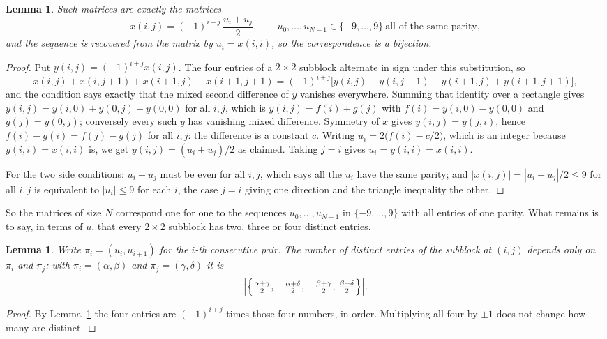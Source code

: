 \documentclass[11pt,a4paper]{article}
\theoremstyle{plain}
\newtheorem{lemma}[theorem]{Lemma}
\theoremstyle{definition}
\begin{document}
\begin{lemma}\label{lem:solve}
Such matrices are exactly the matrices
\[
x(i,j)=(-1)^{i+j}\,\frac{u_i+u_j}{2},
\qquad u_0,\dots,u_{N-1}\in\{-9,\dots,9\}\ \text{all of the same parity},
\]
and the sequence is recovered from the matrix by $u_i=x(i,i)$, so the correspondence is a
bijection.
\end{lemma}

\begin{proof}
Put $y(i,j)=(-1)^{i+j}x(i,j)$. The four entries of a $2\times2$ subblock alternate in sign
under this substitution, so
\[
x(i,j)+x(i,j{+}1)+x(i{+}1,j)+x(i{+}1,j{+}1)
=(-1)^{i+j}\bigl[y(i,j)-y(i,j{+}1)-y(i{+}1,j)+y(i{+}1,j{+}1)\bigr],
\]
and the condition says exactly that the mixed second difference of $y$ vanishes everywhere.
Summing that identity over a rectangle gives
$y(i,j)=y(i,0)+y(0,j)-y(0,0)$ for all $i,j$, which is $y(i,j)=f(i)+g(j)$ with
$f(i)=y(i,0)-y(0,0)$ and $g(j)=y(0,j)$; conversely every such $y$ has vanishing mixed
difference. Symmetry of $x$ gives $y(i,j)=y(j,i)$, hence $f(i)-g(i)=f(j)-g(j)$ for all $i,j$:
the difference is a constant $c$. Writing $u_i=2\bigl(f(i)-c/2\bigr)$, which is an integer
because $y(i,i)=x(i,i)$ is, we get $y(i,j)=(u_i+u_j)/2$ as claimed. Taking $j=i$ gives
$u_i=y(i,i)=x(i,i)$.

For the two side conditions: $u_i+u_j$ must be even for all $i,j$, which says all the $u_i$ have
the same parity; and $|x(i,j)|=|u_i+u_j|/2\le9$ for all $i,j$ is equivalent to $|u_i|\le9$
for each $i$, the case $j=i$ giving one direction and the triangle inequality the other.
\end{proof}

So the matrices of size $N$ correspond one for one to the sequences $u_0,\dots,u_{N-1}$ in
$\{-9,\dots,9\}$ with all entries of one parity. What remains is to say, in terms of $u$,
that every $2\times2$ subblock has two, three or four distinct entries.

\begin{lemma}\label{lem:block}
Write $\pi_i=(u_i,u_{i+1})$ for the $i$-th consecutive pair. The number of distinct entries of
the subblock at $(i,j)$ depends only on $\pi_i$ and $\pi_j$: with $\pi_i=(\alpha,\beta)$ and
$\pi_j=(\gamma,\delta)$ it is
\[
\Bigl|\Bigl\{\tfrac{\alpha+\gamma}{2},\,-\tfrac{\alpha+\delta}{2},\,
-\tfrac{\beta+\gamma}{2},\,\tfrac{\beta+\delta}{2}\Bigr\}\Bigr| .
\]
\end{lemma}

\begin{proof}
By Lemma~\ref{lem:solve} the four entries are $(-1)^{i+j}$ times those four numbers, in
order. Multiplying all four by $\pm1$ does not change how many are distinct.
\end{proof}
\end{document}
